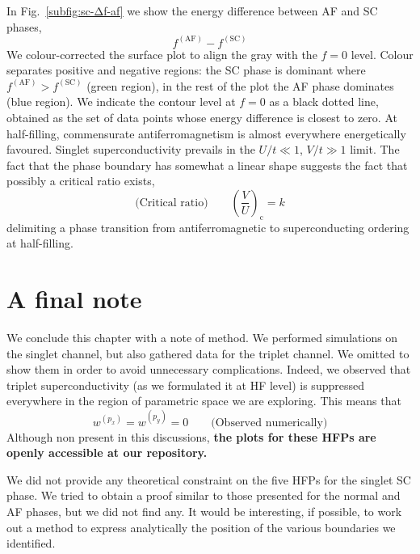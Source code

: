 In Fig.~\ref{subfig:sc-Δf-af} we show the energy difference between AF and SC phases,
\[
	f^{(\mathrm{AF})} - f^{(\mathrm{SC})} 
\]
We colour-corrected the surface plot to align the gray with the $f=0$ level. Colour separates positive and negative regions: the SC phase is dominant where $f^{(\mathrm{AF})} > f^{(\mathrm{SC})}$ (green region), in the rest of the plot the AF phase dominates (blue region). We indicate the contour level at $f=0$ as a black dotted line, obtained as the set of data points whose energy difference is closest to zero. At half-filling, commensurate antiferromagnetism is almost everywhere energetically favoured. Singlet superconductivity prevails in the $U/t \ll 1$, $V/t \gg 1$ limit. The fact that the phase boundary has somewhat a linear shape suggests the fact that possibly a critical ratio exists,
\[
	\text{(Critical ratio)}
	\qquad
	\left(\frac{V}{U}\right)_\mathrm{c} = k
\]
delimiting a phase transition from antiferromagnetic to superconducting ordering at half-filling.

\section{A final note}

We conclude this chapter with a note of method. We performed simulations on the singlet channel, but also gathered data for the triplet channel. We omitted to show them in order to avoid unnecessary complications. Indeed, we observed that triplet superconductivity (as we formulated it at HF level) is suppressed everywhere in the region of parametric space we are exploring. This means that 
\[
	w^{(p_x)} = w^{(p_y)} = 0
	\qquad
	\text{(Observed numerically)}
\]
Although non present in this discussions, {\color{tabred}\textbf{the plots for these HFPs are openly accessible at our repository.}}

We did not provide any theoretical constraint on the five HFPs for the singlet SC phase. We tried to obtain a proof similar to those presented for the normal and AF phases, but we did not find any. It would be interesting, if possible, to work out a method to express analytically the position of the various boundaries we identified.